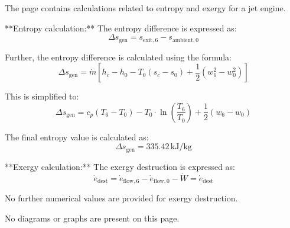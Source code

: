 The page contains calculations related to entropy and exergy for a jet engine.  

**Entropy calculation:**  
The entropy difference is expressed as:  
\[
\Delta s_{\text{gen}} = s_{\text{exit},6} - s_{\text{ambient},0}
\]  

Further, the entropy difference is calculated using the formula:  
\[
\Delta s_{\text{gen}} = \dot{m} \left[ h_c - h_0 - T_0 \left( s_c - s_0 \right) + \frac{1}{2} \left( w_6^2 - w_0^2 \right) \right]
\]  

This is simplified to:  
\[
\Delta s_{\text{gen}} = c_p \left( T_6 - T_0 \right) - T_0 \cdot \ln \left( \frac{T_6}{T_0} \right) + \frac{1}{2} \left( w_6 - w_0 \right)
\]  

The final entropy value is calculated as:  
\[
\Delta s_{\text{gen}} = 335.42 \, \text{kJ/kg}
\]  

**Exergy calculation:**  
The exergy destruction is expressed as:  
\[
\dot{e}_{\text{dest}} = \dot{e}_{\text{flow},6} - \dot{e}_{\text{flow},0} - \dot{W} = \dot{e}_{\text{dest}}
\]  

No further numerical values are provided for exergy destruction.  

No diagrams or graphs are present on this page.